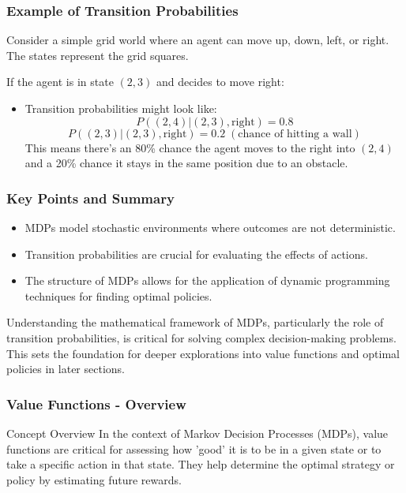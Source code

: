 \documentclass[aspectratio=169]{beamer}
\begin{document}
\begin{frame}[fragile]
    \frametitle{Example of Transition Probabilities}
    Consider a simple grid world where an agent can move up, down, left, or right. The states represent the grid squares. 

    If the agent is in state $(2,3)$ and decides to move right:
    \begin{itemize}
        \item Transition probabilities might look like:
            \begin{equation}
                P((2, 4) | (2, 3), \text{right}) = 0.8
            \end{equation}
            \begin{equation}
                P((2, 3) | (2, 3), \text{right}) = 0.2 \; (\text{chance of hitting a wall})
            \end{equation}
        This means there’s an 80\% chance the agent moves to the right into $(2, 4)$ and a 20\% chance it stays in the same position due to an obstacle.
    \end{itemize}
\end{frame}

\begin{frame}[fragile]
    \frametitle{Key Points and Summary}
    \begin{itemize}
        \item MDPs model stochastic environments where outcomes are not deterministic.
        \item Transition probabilities are crucial for evaluating the effects of actions.
        \item The structure of MDPs allows for the application of dynamic programming techniques for finding optimal policies.
    \end{itemize}

    Understanding the mathematical framework of MDPs, particularly the role of transition probabilities, is critical for solving complex decision-making problems. This sets the foundation for deeper explorations into value functions and optimal policies in later sections.
\end{frame}

\begin{frame}[fragile]
  \frametitle{Value Functions - Overview}
  \begin{block}{Concept Overview}
    In the context of Markov Decision Processes (MDPs), value functions are critical for assessing 
    how 'good' it is to be in a given state or to take a specific action in that state. They help 
    determine the optimal strategy or policy by estimating future rewards.
  \end{block}
\end{frame}
\end{document}
